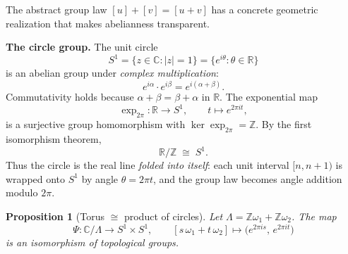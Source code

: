 \documentclass[11pt]{article}
\newcommand{\C}{\mathbb{C}}
\newcommand{\R}{\mathbb{R}}
\newcommand{\Z}{\mathbb{Z}}
\newtheorem*{proposition}{Proposition}
\begin{document}
The abstract group law \([u]+[v]=[u+v]\) has a concrete geometric
realization that makes abelianness transparent.

\medskip
\noindent\textbf{The circle group.}\quad
The unit circle
\[
S^1 = \{z\in\C : |z|=1\} = \{e^{i\theta}:\theta\in\R\}
\]
is an abelian group under \emph{complex multiplication}:
\[
e^{i\alpha}\cdot e^{i\beta} = e^{i(\alpha+\beta)}.
\]
Commutativity holds because \(\alpha+\beta=\beta+\alpha\) in \(\R\).
The exponential map
\[
\exp_{2\pi}:\R\to S^1,\qquad t\mapsto e^{2\pi it},
\]
is a surjective group homomorphism with \(\ker\exp_{2\pi}=\Z\).  By the
first isomorphism theorem,
\[
\R/\Z\;\cong\; S^1.
\]
Thus the circle is the real line \emph{folded into itself}: each unit
interval \([n, n{+}1)\) is wrapped onto \(S^1\) by angle \(\theta=2\pi
t\), and the group law becomes angle addition modulo \(2\pi\).

\begin{proposition}[Torus \(\cong\) product of circles]
\label{prop:s1xs1}
Let \(\Lambda=\Z\omega_1+\Z\omega_2\).  The map
\[
\Psi:\C/\Lambda\longrightarrow S^1\times S^1,
\qquad
[s\,\omega_1+t\,\omega_2]\longmapsto \bigl(e^{2\pi is},\,e^{2\pi it}\bigr)
\]
is an isomorphism of topological groups.
\end{proposition}
\end{document}
